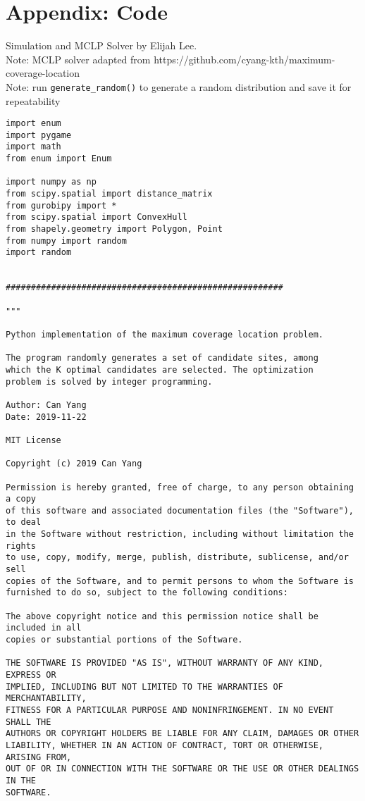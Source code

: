 \section*{Appendix: Code}
	Simulation and MCLP Solver by Elijah Lee.\\
	\indent Note: MCLP solver adapted from https://github.com/cyang-kth/maximum-coverage-location\\
	\indent Note: run \verb|generate_random()| to generate a random distribution and save it for repeatability
	\begin{singlespace}
	\begin{verbatim}
import enum
import pygame
import math
from enum import Enum
 
import numpy as np
from scipy.spatial import distance_matrix
from gurobipy import *
from scipy.spatial import ConvexHull
from shapely.geometry import Polygon, Point
from numpy import random
import random
 
 
#######################################################
 
"""
 
Python implementation of the maximum coverage location problem.
 
The program randomly generates a set of candidate sites, among 
which the K optimal candidates are selected. The optimization 
problem is solved by integer programming. 
 
Author: Can Yang
Date: 2019-11-22
 
MIT License
 
Copyright (c) 2019 Can Yang
 
Permission is hereby granted, free of charge, to any person obtaining a copy
of this software and associated documentation files (the "Software"), to deal
in the Software without restriction, including without limitation the rights
to use, copy, modify, merge, publish, distribute, sublicense, and/or sell
copies of the Software, and to permit persons to whom the Software is
furnished to do so, subject to the following conditions:
 
The above copyright notice and this permission notice shall be included in all
copies or substantial portions of the Software.
 
THE SOFTWARE IS PROVIDED "AS IS", WITHOUT WARRANTY OF ANY KIND, EXPRESS OR
IMPLIED, INCLUDING BUT NOT LIMITED TO THE WARRANTIES OF MERCHANTABILITY,
FITNESS FOR A PARTICULAR PURPOSE AND NONINFRINGEMENT. IN NO EVENT SHALL THE
AUTHORS OR COPYRIGHT HOLDERS BE LIABLE FOR ANY CLAIM, DAMAGES OR OTHER
LIABILITY, WHETHER IN AN ACTION OF CONTRACT, TORT OR OTHERWISE, ARISING FROM,
OUT OF OR IN CONNECTION WITH THE SOFTWARE OR THE USE OR OTHER DEALINGS IN THE
SOFTWARE.
 

\end{verbatim}
\end{singlespace}
